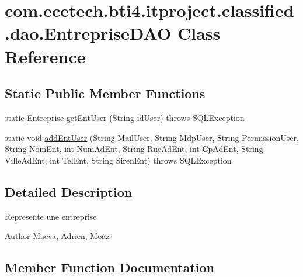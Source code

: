 \hypertarget{classcom_1_1ecetech_1_1bti4_1_1itproject_1_1classified_1_1dao_1_1_entreprise_d_a_o}{}\section{com.\+ecetech.\+bti4.\+itproject.\+classified.\+dao.\+Entreprise\+D\+AO Class Reference}
\label{classcom_1_1ecetech_1_1bti4_1_1itproject_1_1classified_1_1dao_1_1_entreprise_d_a_o}
\subsection*{Static Public Member Functions}
\begin{DoxyCompactItemize}
\item 
static \hyperlink{classcom_1_1ecetech_1_1bti4_1_1itproject_1_1classified_1_1beans_1_1_entreprise}{Entreprise} \hyperlink{classcom_1_1ecetech_1_1bti4_1_1itproject_1_1classified_1_1dao_1_1_entreprise_d_a_o_a158d89d2f3ff3a1e5ca02c9a3751da84}{get\+Ent\+User} (String id\+User)  throws S\+Q\+L\+Exception 
\item 
static void \hyperlink{classcom_1_1ecetech_1_1bti4_1_1itproject_1_1classified_1_1dao_1_1_entreprise_d_a_o_a34495007d915aad23a8ad7a1dab4c179}{add\+Ent\+User} (String Mail\+User, String Mdp\+User, String Permission\+User, String Nom\+Ent, int Num\+Ad\+Ent, String Rue\+Ad\+Ent, int Cp\+Ad\+Ent, String Ville\+Ad\+Ent, int Tel\+Ent, String Siren\+Ent)  throws S\+Q\+L\+Exception 
\end{DoxyCompactItemize}


\subsection{Detailed Description}
Represente une entreprise \begin{DoxyAuthor}{Author}
Maeva, Adrien, Moaz 
\end{DoxyAuthor}


\subsection{Member Function Documentation}
